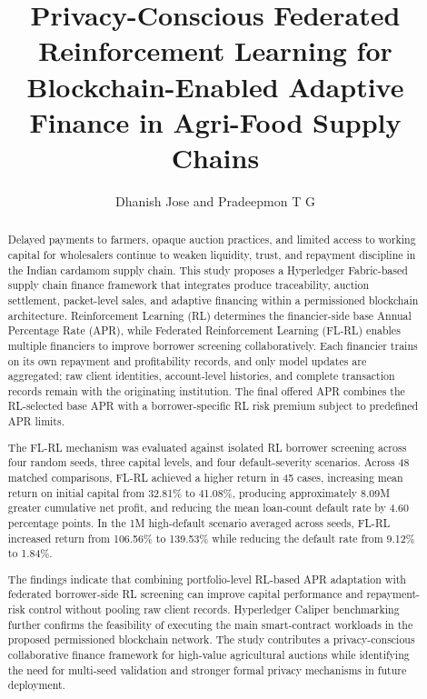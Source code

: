 \documentclass[12pt]{article}
\title{Privacy-Conscious Federated Reinforcement Learning for Blockchain-Enabled Adaptive Finance in Agri-Food Supply Chains}
\author{Dhanish Jose and Pradeepmon T G}
\affil{Department of Mechanical Engineering,\\ National Institute of Technology Calicut, India}
\date{}
\begin{document}
	
	\maketitle
	
	\begin{abstract}
	Delayed payments to farmers, opaque auction practices, and limited access to working capital for wholesalers continue to weaken liquidity, trust, and repayment discipline in the Indian cardamom supply chain. This study proposes a Hyperledger Fabric-based supply chain finance framework that integrates produce traceability, auction settlement, packet-level sales, and adaptive financing within a permissioned blockchain architecture. Reinforcement Learning (RL) determines the financier-side base Annual Percentage Rate (APR), while Federated Reinforcement Learning (FL-RL) enables multiple financiers to improve borrower screening collaboratively. Each financier trains on its own repayment and profitability records, and only model updates are aggregated; raw client identities, account-level histories, and complete transaction records remain with the originating institution. The final offered APR combines the RL-selected base APR with a borrower-specific RL risk premium subject to predefined APR limits.
	
	The FL-RL mechanism was evaluated against isolated RL borrower screening across four random seeds, three capital levels, and four default-severity scenarios. Across 48 matched comparisons, FL-RL achieved a higher return in 45 cases, increasing mean return on initial capital from 32.81\% to 41.08\%, producing approximately 8.09M greater cumulative net profit, and reducing the mean loan-count default rate by 4.60 percentage points. In the 1M high-default scenario averaged across seeds, FL-RL increased return from 106.56\% to 139.53\% while reducing the default rate from 9.12\% to 1.84\%.
	
	The findings indicate that combining portfolio-level RL-based APR adaptation with federated borrower-side RL screening can improve capital performance and repayment-risk control without pooling raw client records. Hyperledger Caliper benchmarking further confirms the feasibility of executing the main smart-contract workloads in the proposed permissioned blockchain network. The study contributes a privacy-conscious collaborative finance framework for high-value agricultural auctions while identifying the need for multi-seed validation and stronger formal privacy mechanisms in future deployment.
	\end{abstract}
	
\end{document}

